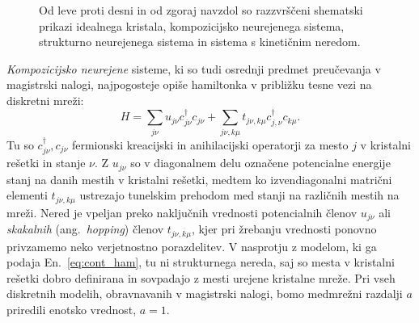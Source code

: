 \begin{minipage}[t]{0.43\textwidth}
\begin{figure}[H]
\caption{Od leve proti desni in od zgoraj navzdol so razzvrščeni shematski prikazi idealnega kristala, kompozicijsko neurejenega sistema, strukturno neurejenega sistema in sistema s kinetičnim neredom.  }
\label{fig:disorder_scheme} 
\end{figure}
\end{minipage}
\emph{Kompozicijsko neurejene} sisteme, ki so tudi osrednji predmet preučevanja v magistrski nalogi, najpogosteje opiše hamiltonka v približku tesne vezi na diskretni mreži:
\begin{equation}\label{eq:disc_ham}
H=\sum\limits_{j\nu}u_{j\nu}c^\dagger_{j\nu}c_{j\nu} + \sum\limits_{j\nu, k\mu} t_{j\nu, k\mu} c^\dagger_{j,\nu}c_{k\mu}.
\end{equation}
Tu so $c^\dagger_{j\nu}, c_{j\nu}$ fermionski kreacijski in anihilacijski operatorji za mesto $j$ v kristalni rešetki in stanje $\nu$. Z $u_{j\nu}$ so v diagonalnem delu označene potencialne energije stanj na danih mestih v kristalni rešetki, medtem ko izvendiagonalni matrični elementi $t_{j\nu, k\mu}$ ustrezajo tunelskim prehodom med stanji na različnih mestih na mreži. Nered je vpeljan preko naključnih vrednosti potencialnih členov $u_{j\nu}$ ali \emph{skakalnih} (ang.~\emph{hopping}) členov $t_{j\nu, k\mu}$, kjer pri žrebanju vrednosti ponovno privzamemo neko verjetnostno porazdelitev. V nasprotju z modelom, ki ga podaja En.~\eqref{eq:cont_ham}, tu ni strukturnega nereda, saj so mesta v kristalni rešetki dobro definirana in sovpadajo z mesti urejene kristalne mreže. Pri vseh diskretnih modelih, obravnavanih v magistrski nalogi, bomo medmrežni razdalji $a$ priredili enotsko vrednost, $a=1.$ \\\\
